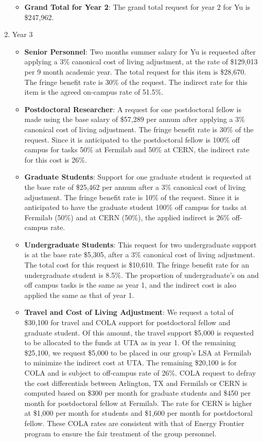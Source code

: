 \begin{enumerate}
\begin{itemize}[noitemsep,nolistsep]
\item {{\bf Grand Total for Year 2}: The grand total request for year 2 for Yu is \$247,962.}

\end{itemize}

\item{Year 3}
\begin{itemize}[noitemsep,nolistsep]
\item{{\bf Senior Personnel}: Two months summer salary for Yu is requested after applying a 3\% canonical cost of living adjustment, at the rate of \$129,013 per 9 month academic year.  The total request for this item is \$28,670.   The fringe benefit rate is 30\% of the request.  The indirect rate for this item is the agreed on-campus rate of 51.5\%.}

\item {{\bf Postdoctoral Researcher}: A request for one postdoctoral fellow is made using the base salary of \$57,289 per annum after applying a 3\% canonical cost of living adjustment.  The fringe benefit rate is 30\% of the request.  Since it is anticipated to the postdoctoral fellow is 100\% off campus for tasks 50\% at Fermilab and 50\% at CERN, the indirect rate for this cost is 26\%.} 

\item{{\bf Graduate Students}: Support for one graduate student is requested at the base rate of \$25,462 per annum after a 3\% canonical cost of living adjustment.   The fringe benefit rate is 10\% of the request.  Since it is anticipated to have the graduate student 100\% off campus for tasks at Fermilab (50\%) and at CERN (50\%), the applied indirect is 26\% off-campus rate.}

\item {{\bf Undergraduate Students}: This request for two undergraduate support is at the base rate \$5,305, after a 3\% canonical cost of living adjustment.  The total cost for this request is \$10,610.  The fringe benefit rate for an undergraduate student is 8.5\%.  The proportion of undergraduate’s on and off campus tasks is the same as year 1, and the indirect cost is also applied the same as that of year 1.}

\item{{\bf Travel and Cost of Living Adjustment}: We request a total of \$30,100 for travel and COLA support for postdoctoral fellow and graduate student.   Of this amount, the travel support \$5,000 is requested to be allocated to the funds at UTA as in year 1.  Of the remaining \$25,100, we request \$5,000 to be placed in our group’s LSA at Fermilab to minimize the indirect cost at UTA.   The remaining \$20,100 is for COLA and is subject to off-campus rate of 26\%.  COLA request to defray the cost differentials between Arlington, TX and Fermilab or CERN is computed based on \$300 per month for graduate students and \$450 per month for postdoctoral fellow at Fermilab.  The rate for CERN is higher at \$1,000 per month for students and \$1,600 per month for postdoctoral fellow.  These COLA rates are consistent with that of Energy Frontier program to ensure the fair treatment of the group personnel.  

}
\end{itemize}
\end{enumerate}
